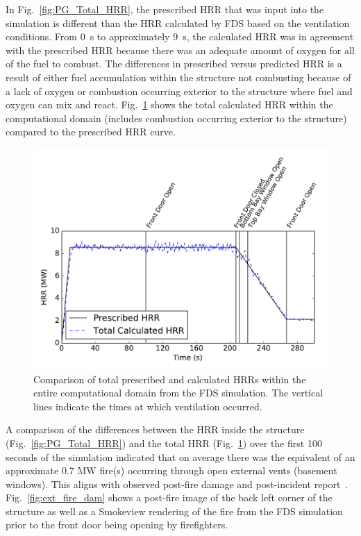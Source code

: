 \documentclass[12pt,oneside]{book}
\begin{document}
In Fig.~\ref{fig:PG_Total_HRR}, the prescribed HRR that was input into the simulation is different than the HRR calculated by FDS based on the ventilation conditions. From 0~s to approximately 9~s, the calculated HRR was in agreement with the prescribed HRR because there was an adequate amount of oxygen for all of the fuel to combust. The differences in prescribed versus predicted HRR is a result of either fuel accumulation within the structure not combusting because of a lack of oxygen or combustion occurring exterior to the structure where fuel and oxygen can mix and react. Fig.~\ref{fig:PG_9MW_HRR} shows the total calculated HRR within the computational domain (includes combustion occurring exterior to the structure) compared to the prescribed HRR curve.

\begin{figure}[!ht]
\includegraphics[width=5in]{../Figures/PG_9MW_HRR}
\caption[Prescribed and total calculated HRRs vs. time from the simulation.]
{Comparison of total prescribed and calculated HRRs within the entire computational domain from the FDS simulation. The vertical lines indicate the times at which ventilation occurred.}
\label{fig:PG_9MW_HRR}
\end{figure}

A comparison of the differences between the HRR inside the structure (Fig.~\ref{fig:PG_Total_HRR}) and the total HRR (Fig.~\ref{fig:PG_9MW_HRR}) over the first 100 seconds of the simulation indicated that on average there was the equivalent of an approximate 0.7 MW fire(s) occurring through open external vents (basement windows). This aligns with observed post-fire damage and post-incident report~\cite{PGCounty2013}. Fig.~\ref{fig:ext_fire_dam} shows a post-fire image of the back left corner of the structure as well as a Smokeview rendering of the fire from the FDS simulation prior to the front door being opening by firefighters.
\end{document}
